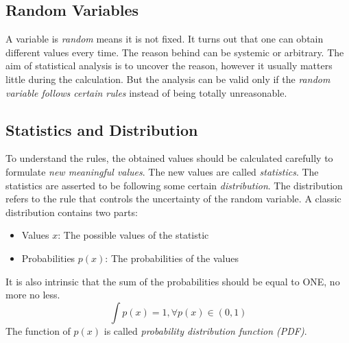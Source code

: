 \documentclass[../main.tex]{subfiles}
\begin{document}
\subsection{Random Variables}
A variable is \emph{random} means it is not fixed.
It turns out that one can obtain different values every time.
The reason behind can be systemic or arbitrary.
The aim of statistical analysis is to uncover the reason, however it usually matters little during the calculation.
But the analysis can be valid only if the \emph{random variable follows certain rules} instead of being totally unreasonable.

\subsection{Statistics and Distribution}
To understand the rules, the obtained values should be calculated carefully to formulate \emph{new meaningful values}.
The new values are called \emph{statistics}.
The statistics are asserted to be following some certain \emph{distribution}.
The distribution refers to the rule that controls the uncertainty of the random variable.
A classic distribution contains two parts:
\begin{itemize}
    \item Values $x$: The possible values of the statistic
    \item Probabilities $p(x)$: The probabilities of the values
\end{itemize}
It is also intrinsic that the sum of the probabilities should be equal to ONE, no more no less.
\begin{equation*}
    \int p(x) = 1, \forall p(x) \in (0, 1)
\end{equation*}
The function of $p(x)$ is called \emph{probability distribution function (PDF)}.
\end{document}
